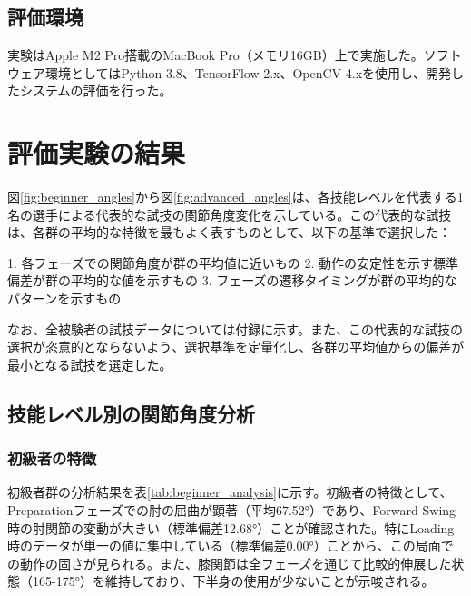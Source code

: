 \documentclass[oneside]{suribt}[11pt]
\begin{document}
\subsection{評価環境}
実験はApple M2 Pro搭載のMacBook Pro（メモリ16GB）上で実施した。ソフトウェア環境としてはPython 3.8、TensorFlow 2.x、OpenCV 4.xを使用し、開発したシステムの評価を行った。

\section{評価実験の結果}
図\ref{fig:beginner_angles}から図\ref{fig:advanced_angles}は、各技能レベルを代表する1名の選手による代表的な試技の関節角度変化を示している。この代表的な試技は、各群の平均的な特徴を最もよく表すものとして、以下の基準で選択した：

1. 各フェーズでの関節角度が群の平均値に近いもの
2. 動作の安定性を示す標準偏差が群の平均的な値を示すもの
3. フェーズの遷移タイミングが群の平均的なパターンを示すもの

なお、全被験者の試技データについては付録に示す。また、この代表的な試技の選択が恣意的とならないよう、選択基準を定量化し、各群の平均値からの偏差が最小となる試技を選定した。

\subsection{技能レベル別の関節角度分析}

\subsubsection{初級者の特徴}
初級者群の分析結果を表\ref{tab:beginner_analysis}に示す。初級者の特徴として、Preparationフェーズでの肘の屈曲が顕著（平均67.52°）であり、Forward Swing時の肘関節の変動が大きい（標準偏差12.68°）ことが確認された。特にLoading時のデータが単一の値に集中している（標準偏差0.00°）ことから、この局面での動作の固さが見られる。また、膝関節は全フェーズを通じて比較的伸展した状態（165-175°）を維持しており、下半身の使用が少ないことが示唆される。
\end{document}
